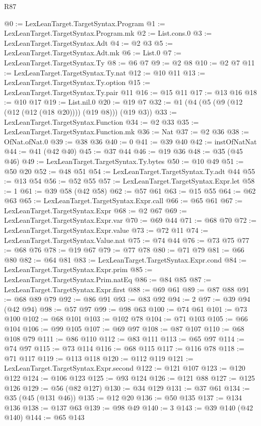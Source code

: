 \begin{lexlean}{R87}
\begin{coremodule}
@0 := LexLeanTarget.TargetSyntax.Program
@1 := LexLeanTarget.TargetSyntax.Program.mk
@2 := List.cons.{0}
@3 := LexLeanTarget.TargetSyntax.Adt
@4 := @2 @3
@5 := LexLeanTarget.TargetSyntax.Adt.mk
@6 := List.{0}
@7 := LexLeanTarget.TargetSyntax.Ty
@8 := @6 @7
@9 := @2 @8
@10 := @2 @7
@11 := LexLeanTarget.TargetSyntax.Ty.nat
@12 := @10 @11
@13 := LexLeanTarget.TargetSyntax.Ty.option
@15 := LexLeanTarget.TargetSyntax.Ty.pair @11
@16 := @15 @11
@17 := @13 @16
@18 := @10 @17
@19 := List.nil.{0}
@20 := @19 @7
@32 := @1 (@4 (@5 (@9 (@12 (@12 (@12 (@18 @20)))) (@19 @8))) (@19 @3))
@33 := LexLeanTarget.TargetSyntax.Function
@34 := @2 @33
@35 := LexLeanTarget.TargetSyntax.Function.mk
@36 := Nat
@37 := @2 @36
@38 := OfNat.ofNat.{0}
@39 := @38 @36
@40 := 0
@41 := @39 @40
@42 := instOfNatNat
@44 := @41 (@42 @40)
@45 := @37 @44
@46 := @19 @36
@48 := @35 (@45 @46)
@49 := LexLeanTarget.TargetSyntax.Ty.bytes
@50 := @10 @49
@51 := @50 @20
@52 := @48 @51
@54 := LexLeanTarget.TargetSyntax.Ty.adt @44
@55 := @13 @54
@56 := @52 @55
@57 := LexLeanTarget.TargetSyntax.Expr.let
@58 := 1
@61 := @39 @58 (@42 @58)
@62 := @57 @61
@63 := @15 @55
@64 := @62 @63
@65 := LexLeanTarget.TargetSyntax.Expr.call
@66 := @65 @61
@67 := LexLeanTarget.TargetSyntax.Expr
@68 := @2 @67
@69 := LexLeanTarget.TargetSyntax.Expr.var
@70 := @69 @44
@71 := @68 @70
@72 := LexLeanTarget.TargetSyntax.Expr.value
@73 := @72 @11
@74 := LexLeanTarget.TargetSyntax.Value.nat
@75 := @74 @44
@76 := @73 @75
@77 := @68 @76
@78 := @19 @67
@79 := @77 @78
@80 := @71 @79
@81 := @66 @80
@82 := @64 @81
@83 := LexLeanTarget.TargetSyntax.Expr.cond
@84 := LexLeanTarget.TargetSyntax.Expr.prim
@85 := LexLeanTarget.TargetSyntax.Prim.natEq
@86 := @84 @85
@87 := LexLeanTarget.TargetSyntax.Expr.first
@88 := @69 @61
@89 := @87 @88
@91 := @68 @89 @79
@92 := @86 @91
@93 := @83 @92
@94 := 2
@97 := @39 @94 (@42 @94)
@98 := @57 @97
@99 := @98 @63
@100 := @74 @61
@101 := @73 @100
@102 := @68 @101
@103 := @102 @78
@104 := @71 @103
@105 := @66 @104
@106 := @99 @105
@107 := @69 @97
@108 := @87 @107
@110 := @68 @108 @79
@111 := @86 @110
@112 := @83 @111
@113 := @65 @97
@114 := @74 @97
@115 := @73 @114
@116 := @68 @115
@117 := @116 @78
@118 := @71 @117
@119 := @113 @118
@120 := @112 @119
@121 := LexLeanTarget.TargetSyntax.Expr.second
@122 := @121 @107
@123 := @120 @122
@124 := @106 @123
@125 := @93 @124
@126 := @121 @88
@127 := @125 @126
@129 := @56 (@82 @127)
@130 := @34 @129
@131 := @37 @61
@134 := @35 (@45 (@131 @46))
@135 := @12 @20
@136 := @50 @135
@137 := @134 @136
@138 := @137 @63
@139 := @98 @49
@140 := 3
@143 := @39 @140 (@42 @140)
@144 := @65 @143

\end{coremodule}
\end{lexlean}
